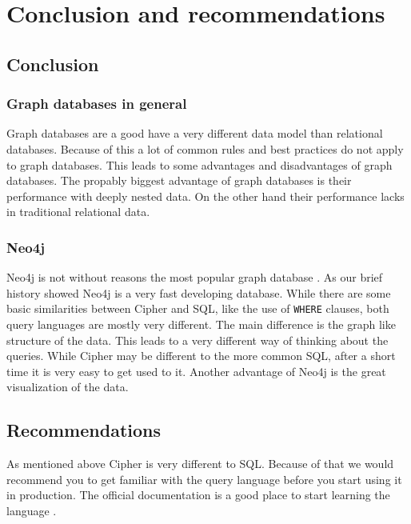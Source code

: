 \section{Conclusion and recommendations}
\subsection{Conclusion}
\subsubsection{Graph databases in general}
Graph databases are a good have a very different data model than relational
databases. Because of this a lot of common rules and best practices do not apply
to graph databases. This leads to some advantages and disadvantages of graph
databases. The propably biggest advantage of graph databases is their
performance with deeply nested data. On the other hand their performance lacks
in traditional relational data.

\subsubsection{Neo4j}
Neo4j is not without reasons the most popular graph database
\cite{db-engines}. As our brief history showed
Neo4j is a very fast developing database. While there are some basic
similarities between Cipher and SQL, like the use of \texttt{WHERE} clauses,
both query languages are mostly very different. The main difference is the graph
like structure of the data. This leads to a very different way of thinking about
the queries. While Cipher may be different to the more common SQL, after a short
time it is very easy to get used to it. Another advantage of Neo4j is the great
visualization of the data.

\subsection{Recommendations}
As mentioned above Cipher is very different to SQL. Because of that we would
recommend you to get familiar with the query language before you start using it
in production. The official documentation is a good place to start learning the
language \cite{neo4j:cypher-manual}.

